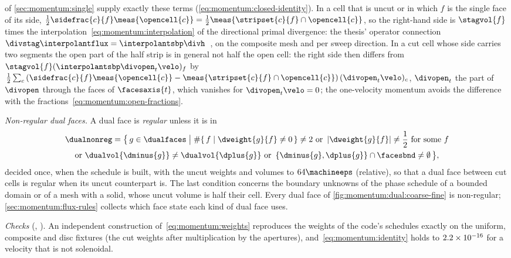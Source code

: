 of \cref{sec:momentum:single} supply exactly these terms (\cref{eq:momentum:closed-identity}).
In a cell that is uncut or in which $f$ is the single face of its side,
$\half\sidefrac{c}{f}\meas{\opencell{c}}=\half\meas{\stripset{c}{f}\cap\opencell{c}}$,
so the right-hand side is $\stagvol{f}$ times the
interpolation~\cref{eq:momentum:interpolation} of the directional primal
divergence: the thesis' operator connection
$\divstag\interpolantflux=\interpolantsbp\divh$~, on the composite mesh and per sweep direction. In a cut cell
whose side carries two segments the open part of the half strip is in general
not half the open cell: the right side then differs from
$\stagvol{f}(\interpolantsbp\divopen_t\velo)_f$ by
$\half\sum_{c}\roundpar{\sidefrac{c}{f}\meas{\opencell{c}}-\meas{\stripset{c}{f}\cap\opencell{c}}}(\divopen_t\velo)_c$,
$\divopen_t$ the part of $\divopen$ through the faces of $\facesaxis{t}$, which
vanishes for $\divopen_t\velo=0$; the one-velocity momentum avoids the
difference with the fractions~\cref{eq:momentum:open-fractions}.

\emph{Non-regular dual faces.} A dual face is \emph{regular} unless it is in
\begin{multline}\label{eq:momentum:regular}
  \dualnonreg=\bigl\{\,g\in\dualfaces\bigm|\#\set{f}{\dweight{g}{f}\neq0}\neq2
    \ \text{or}\ \abs{\dweight{g}{f}}\neq\half\ \text{for some }f\\
    \text{or}\ \dualvol{\dminus{g}}\neq\dualvol{\dplus{g}}
    \ \text{or}\ \curlypar{\dminus{g},\dplus{g}}\cap\facesbnd\neq\emptyset\,\bigr\},
\end{multline}
decided once, when the schedule is built, with the uncut weights and volumes
to $64\machineeps$ (relative), so that a dual face between cut cells is
regular when its uncut counterpart is. The last condition concerns the
boundary unknowns of the phase schedule of a bounded domain or of a mesh with
a solid, whose uncut volume is half their cell. Every dual face of
\cref{fig:momentum:dual:coarse-fine} is non-regular;
\cref{sec:momentum:flux-rules} collects which face state each kind of dual
face uses.

\emph{Checks} (, ). An
independent construction of~\cref{eq:momentum:weights} reproduces the weights
of the code's schedules exactly on the uniform, composite and disc fixtures
(the cut weights after multiplication by the apertures),
and~\cref{eq:momentum:identity} holds to $2.2\times10^{-16}$ for a velocity that
is not solenoidal.

